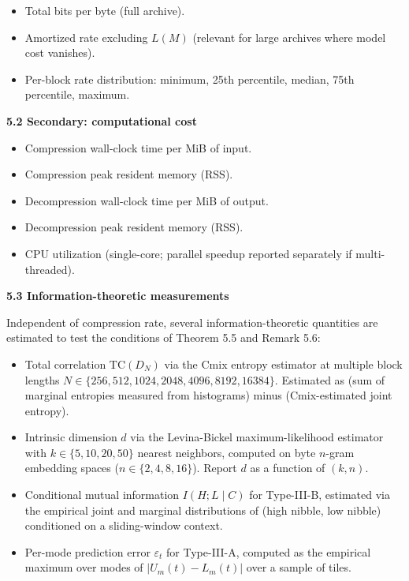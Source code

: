 \documentclass[
]{article}
\begin{document}
\begin{itemize}
\item
  Total bits per byte (full archive).
\item
  Amortized rate excluding $L(M)$ (relevant for large archives where
  model cost vanishes).
\item
  Per-block rate distribution: minimum, 25th percentile, median, 75th
  percentile, maximum.
\end{itemize}

\textbf{5.2 Secondary: computational cost}

\begin{itemize}
\item
  Compression wall-clock time per MiB of input.
\item
  Compression peak resident memory (RSS).
\item
  Decompression wall-clock time per MiB of output.
\item
  Decompression peak resident memory (RSS).
\item
  CPU utilization (single-core; parallel speedup reported separately if
  multi-threaded).
\end{itemize}

\textbf{5.3 Information-theoretic measurements}

Independent of compression rate, several information-theoretic
quantities are estimated to test the conditions of Theorem 5.5 and
Remark 5.6:

\begin{itemize}
\item
  Total correlation $\mathrm{TC}(D_N)$ via the Cmix entropy
  estimator at multiple block lengths
  $N \in \{256, 512, 1024, 2048, 4096, 8192, 16384\}$. Estimated as
  (sum of marginal entropies measured from histograms) minus
  (Cmix-estimated joint entropy).
\item
  Intrinsic dimension $d$ via the Levina-Bickel maximum-likelihood
  estimator with $k \in \{5, 10, 20, 50\}$ nearest neighbors, computed
  on byte $n$-gram embedding spaces ($n \in \{2, 4, 8, 16\}$). Report
  $d$ as a function of $(k, n)$.
\item
  Conditional mutual information $I(H ; L \mid C)$ for Type-III-B,
  estimated via the empirical joint and marginal distributions of
  (high nibble, low nibble) conditioned on a sliding-window context.
\item
  Per-mode prediction error $\varepsilon_t$ for Type-III-A, computed
  as the empirical maximum over modes of $|U_m(t) - L_m(t)|$ over a
  sample of tiles.
\end{itemize}
\end{document}
